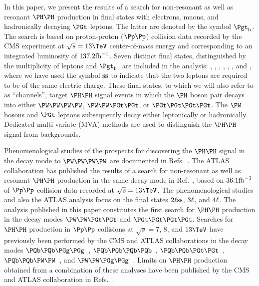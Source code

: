 In this paper, we present the results of a search for non-resonant as well as resonant $\HH$ production
in final states with electrons, muons, and hadronically decaying $\PGt$ leptons. The latter are denoted by the symbol $\tauh$.
The search is based on proton-proton ($\Pp\Pp$) collision data recorded by the CMS experiment at $\sqrt{s} = 13\TeV$ center-of-mass energy
and corresponding to an integrated luminosity of $137.2\fbinv$.
Seven distinct final states, distinguished by the multiplicity of leptons and $\tauh$, are included in the analysis:
\zeroLeptonFourTau, \oneLeptonThreeTau, \twoLeptonssZeroTau, \twoLeptonTwoTau, \threeLeptonZeroTau, \threeLeptonOneTau, and \fourLeptonZeroTau,
where we have used the symbol $\ss$ to indicate that the two leptons are required to be of the same electric charge. 
These final states, to which we will also refer to as ``channels'', 
target $\HH$ signal events in which the $\PHiggs$ boson pair decays into either $\PW\PW\PW\PW$, $\PW\PW\PGt\PGt$, or $\PGt\PGt\PGt\PGt$.
The $\PW$ bosons and $\PGt$ leptons subsequently decay either leptonically or hadronically.
Dedicated multi-variate (MVA) methods are used to distinguish the $\PHiggs\PHiggs$ signal from backgrounds.

Phenomenological studies of the prospects for discovering the $\HH$ signal in the decay mode to $\PW\PW\PW\PW$ 
are documented in Refs.~\cite{Baur:2002rb,Baur:2002qd,Li:2015yia,Adhikary:2017jtu,Ren:2017jbg}.
The ATLAS collaboration has published the results of a search for non-resonant as well as resonant $\HH$ production in the same decay mode in Ref.~\cite{Aaboud:2018ksn},
based on $36.1\fbinv$ of $\Pp\Pp$ collision data recorded at $\sqrt{s} = 13\TeV$.
The phenomenological studies and also the ATLAS analysis focus on the final states $\twoLeptonssZeroTau$, $\threeLeptonZeroTau$, and $\fourLeptonZeroTau$.
The analysis published in this paper constitutes the first search for $\HH$ production in the decay modes $\PW\PW\PGt\PGt$ and $\PGt\PGt\PGt\PGt$.
Searches for $\HH$ production in $\Pp\Pp$ collisions at $\sqrt{s} = 7$, $8$, and $13\TeV$
have previously been performed by the CMS and ATLAS collaborations in the decay modes 
$\Pbottom\Pbottom\PGg\PGg$~\cite{Aad:2014yja,Khachatryan:2016sey,Sirunyan:2018iwt,Aaboud:2018ftw}, 
$\Pbottom\Pbottom\Pbottom\Pbottom$~\cite{Khachatryan:2015yea,Aad:2015uka,Aaboud:2018knk,Sirunyan:2018zkk,Sirunyan:2018tki}, 
$\Pbottom\Pbottom\PGt\PGt$~\cite{Aad:2015xja,Sirunyan:2017tqo,Sirunyan:2017djm,Aaboud:2018sfw}, 
$\Pbottom\Pbottom\PW\PW$~\cite{Sirunyan:2017guj}, 
and $\PW\PW\PGg\PGg$~\cite{Aaboud:2018ewm}.
Limits on $\HH$ production obtained from a combination of these analyses have been published by the CMS and ATLAS collaboration 
in Refs.~\cite{Aad:2015xja,Sirunyan:2017tqo,Sirunyan:2018ayu}.

